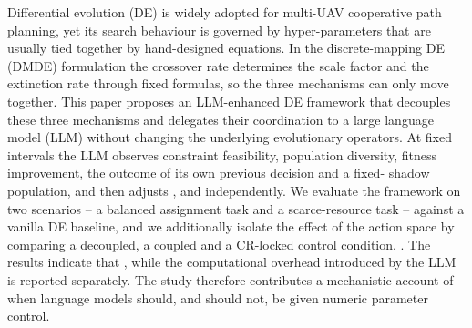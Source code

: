 
Differential evolution (DE) is widely adopted for multi-UAV cooperative path
planning, yet its search behaviour is governed by hyper-parameters that are
usually tied together by hand-designed equations. In the discrete-mapping DE
(DMDE) formulation the crossover rate \CR{} determines the scale factor
\Ffactor{} and the extinction rate \GMR{} through fixed formulas, so the three
mechanisms can only move together. This paper proposes an LLM-enhanced DE
framework that decouples these three mechanisms and delegates their
coordination to a large language model (LLM) without changing the underlying
evolutionary operators. At fixed intervals the LLM observes constraint
feasibility, population diversity, fitness improvement, the outcome of its own
previous decision and a fixed-\CR{} shadow population, and then adjusts \CR{},
\Ffactor{} and \GMR{} independently. We evaluate the framework on two scenarios
-- a balanced assignment task and a scarce-resource task -- against a vanilla
DE baseline, and we additionally isolate the effect of the action space by
comparing a decoupled, a coupled and a CR-locked control condition.
.
The results indicate that , while the computational overhead
introduced by the LLM is reported separately. The study therefore contributes a
mechanistic account of when language models should, and should not, be given
numeric parameter control.

